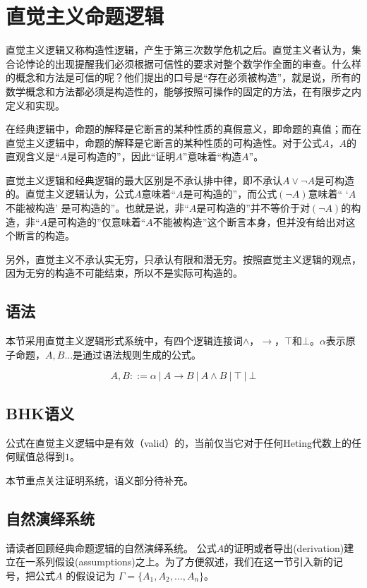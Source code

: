 \section{直觉主义命题逻辑}

直觉主义逻辑又称构造性逻辑，产生于第三次数学危机之后。直觉主义者认为，集合论悖论的出现提醒我们必须根据可信性的要求对整个数学作全面的审查。什么样的概念和方法是可信的呢？他们提出的口号是``存在必须被构造''，就是说，所有的数学概念和方法都必须是构造性的，能够按照可操作的固定的方法，在有限步之内定义和实现。


在经典逻辑中，命题的解释是它断言的某种性质的真假意义，即命题的真值；而在直觉主义逻辑中，命题的解释是它断言的某种性质的可构造性。对于公式$A$，$A$的直观含义是``$A$是可构造的''，因此``证明$A$''意味着``构造$A$''。


直觉主义逻辑和经典逻辑的最大区别是不承认排中律，即不承认$A \lor \neg A$是可构造的。直觉主义逻辑认为，公式$A$意味着``$A$是可构造的''，而公式$(\neg A)$意味着`` `$A$不能被构造' 是可构造的''。也就是说，非``$A$是可构造的''并不等价于对$(\neg A)$的构造，非``$A$是可构造的''仅意味着``$A$不能被构造''这个断言本身，但并没有给出对这个断言的构造。

另外，直觉主义不承认实无穷，只承认有限和潜无穷。按照直觉主义逻辑的观点，因为无穷的构造不可能结束，所以不是实际可构造的。


\subsection{语法}

本节采用直觉主义逻辑形式系统中，有四个逻辑连接词$\land$，$\to$，$\top$和$\bot$。$\alpha$表示原子命题，$A, B...$是通过语法规则生成的公式。

$$A, B ::= \alpha \ | \ A \to B \ | \ A \land B \ | \ \top \ | \ \bot$$


\subsection{BHK语义}

公式在直觉主义逻辑中是有效（valid）的，当前仅当它对于任何Heting代数上的任何赋值总得到$1$。

本节重点关注证明系统，语义部分待补充。



\subsection{自然演绎系统}

请读者回顾经典命题逻辑的自然演绎系统。 公式$A$的证明或者导出(derivation)建立在一系列假设(assumptions)之上。为了方便叙述，我们在这一节引入新的记号，把公式$A$ 的假设记为 $\Gamma = \{A_1, A_2,...,A_n\}$。

